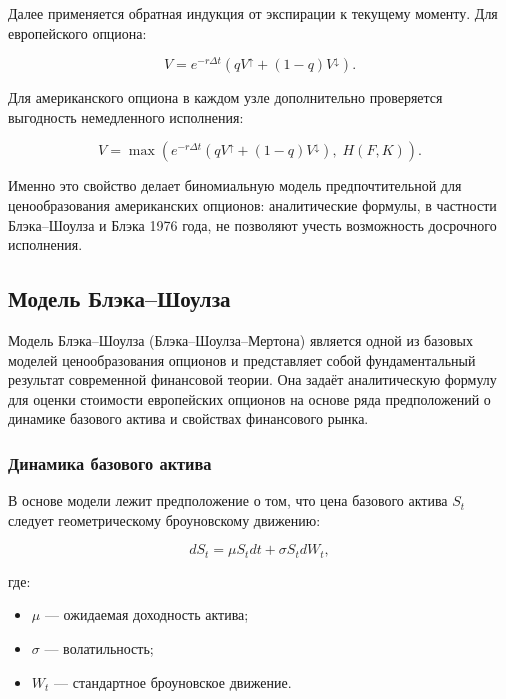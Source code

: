 \documentclass[11pt,a4paper]{article}
\begin{document}
Далее применяется обратная индукция от экспирации к текущему моменту. Для европейского опциона:

\begin{equation}
V = e^{-r\Delta t}\!\left(q V^{\uparrow} + (1-q) V^{\downarrow}\right).
\end{equation}

Для американского опциона в каждом узле дополнительно проверяется выгодность немедленного исполнения:

\begin{equation}
V = \max\!\left( e^{-r\Delta t}\!\left(q V^{\uparrow} + (1-q) V^{\downarrow}\right),\; H(F, K) \right).
\end{equation}

Именно это свойство делает биномиальную модель предпочтительной для ценообразования американских опционов: аналитические формулы, в частности Блэка--Шоулза и Блэка 1976 года, не позволяют учесть возможность досрочного исполнения.

\subsection{Модель Блэка--Шоулза}

Модель Блэка--Шоулза (Блэка--Шоулза--Мертона) является одной из базовых моделей ценообразования опционов и представляет собой фундаментальный результат современной финансовой теории. Она задаёт аналитическую формулу для оценки стоимости европейских опционов на основе ряда предположений о динамике базового актива и свойствах финансового рынка.

\subsubsection{Динамика базового актива}

В основе модели лежит предположение о том, что цена базового актива $S_t$ следует геометрическому броуновскому движению:

\begin{equation}
dS_t = \mu S_t dt + \sigma S_t dW_t,
\end{equation}

где:

\begin{itemize}
    \item $\mu$ --- ожидаемая доходность актива;
    \item $\sigma$ --- волатильность;
    \item $W_t$ --- стандартное броуновское движение.
\end{itemize}
\end{document}
